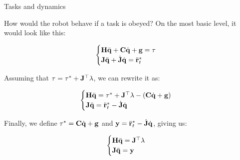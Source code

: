 \documentclass{beamer}
\begin{document}
\begin{frame}{Tasks and dynamics}
	\begin{flushleft}
		
		How would the robot behave if a task is obeyed? On the most basic level, it would look like this:
		
		\begin{equation}
			\begin{cases}
				\mathbf{H} \ddot{\mathbf{q}} + \mathbf{C} \dot{\mathbf{q}} + \mathbf{g} = \tau \\
				\mathbf{J}\ddot{\mathbf{q}} + \dot{\mathbf{J}} \dot{\mathbf{q}} = \ddot{\mathbf{r}}^*_t
			\end{cases}
		\end{equation}		
		
		Assuming that $\tau = \tau^* + \mathbf{J}^\top \lambda$, we can rewrite it as:
		
		\begin{equation}
	\begin{cases}
		\mathbf{H} \ddot{\mathbf{q}}  = \tau^* + \mathbf{J}^\top \lambda - (\mathbf{C} \dot{\mathbf{q}} + \mathbf{g}) \\
		\mathbf{J}\ddot{\mathbf{q}} = \ddot{\mathbf{r}}^*_t - \dot{\mathbf{J}} \dot{\mathbf{q}}
	\end{cases}
		\end{equation}				
		
		Finally, we define $\tau^* = \mathbf{C} \dot{\mathbf{q}} + \mathbf{g}$ and $\mathbf{y} = \ddot{\mathbf{r}}^*_t - \dot{\mathbf{J}} \dot{\mathbf{q}}$, giving us:
		
		\begin{equation}
	\begin{cases}
		\mathbf{H} \ddot{\mathbf{q}}  =  \mathbf{J}^\top \lambda \\
		\mathbf{J}\ddot{\mathbf{q}}    = \mathbf{y}
	\end{cases}
		\end{equation}		
		
	\end{flushleft}
\end{frame}
\end{document}
